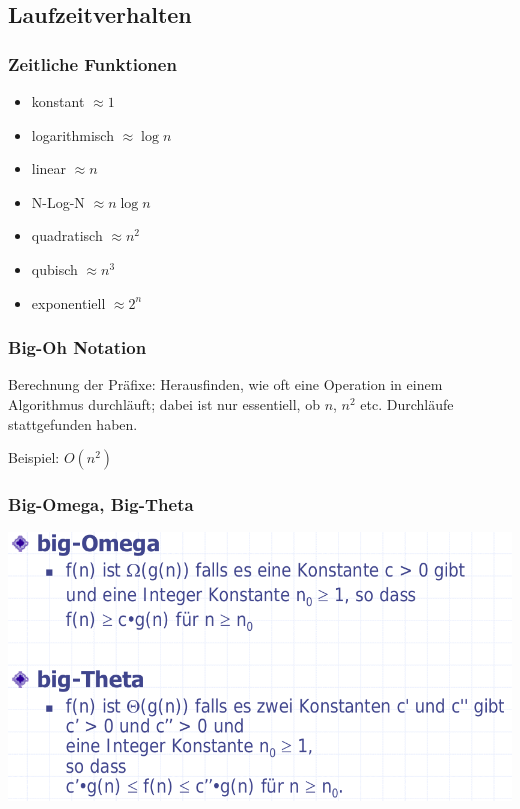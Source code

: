 \subsection{Laufzeitverhalten}

\subsubsection{Zeitliche Funktionen}
\begin{itemize}
	\item konstant $\approx 1$
	\item logarithmisch $\approx \log n$
	\item linear $\approx  n$
	\item N-Log-N $\approx n \log n$
	\item quadratisch $\approx n^2$
	\item qubisch $\approx n^3$
	\item exponentiell $\approx 2^n$
\end{itemize}

\subsubsection{Big-Oh Notation}
 
Berechnung der Präfixe: Herausfinden, wie oft eine Operation in einem Algorithmus durchläuft; dabei ist nur essentiell, ob $n$, $n^2$ etc. Durchläufe stattgefunden haben.

Beispiel: $O(n^2)$

\subsubsection{Big-Omega, Big-Theta}

\includegraphics[scale=0.3]{img/verwandte-big-oh.png}

